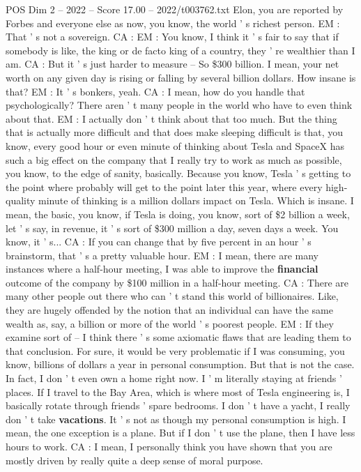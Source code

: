 \begin{textsample}{POS Dim 2 – 2022 – Score 17.00 – 2022/t003762.txt}
Elon, you are reported by Forbes and everyone else as now, you know, the world ' s richest person.
EM : That ' s not a sovereign.
CA : EM : You know, I think it ' s fair to say that if somebody is like, the king or de facto king of a country, they ' re wealthier than I am.
CA : But it ' s just harder to measure -- So \$300 billion.
I mean, your net worth on any given day is rising or falling by several billion dollars.
How insane is that?
EM : It ' s bonkers, yeah.
CA : I mean, how do you handle that psychologically?
There aren ' t many people in the world who have to even think about that.
EM : I actually don ' t think about that too much.
But the thing that is actually more difficult and that does make sleeping difficult is that, you know, every good hour or even minute of thinking about Tesla and SpaceX has such a big effect on the company that I really try to work as much as possible, you know, to the edge of sanity, basically.
Because you know, Tesla ' s getting to the point where probably will get to the point later this year, where every high-quality minute of thinking is a million dollars impact on Tesla.
Which is insane.
I mean, the basic, you know, if Tesla is doing, you know, sort of \$2 billion a week, let ' s say, in revenue, it ' s sort of \$300 million a day, seven days a week.
You know, it ' s...
CA : If you can change that by five percent in an hour ' s brainstorm, that ' s a pretty valuable hour.
EM : I mean, there are many instances where a half-hour meeting, I was able to improve the \textbf{financial} outcome of the company by \$100 million in a half-hour meeting.
CA : There are many other people out there who can ' t stand this world of billionaires.
Like, they are hugely offended by the notion that an individual can have the same wealth as, say, a billion or more of the world ' s poorest people.
EM : If they examine sort of -- I think there ' s some axiomatic flaws that are leading them to that conclusion.
For sure, it would be very problematic if I was consuming, you know, billions of dollars a year in personal consumption.
But that is not the case.
In fact, I don ' t even own a home right now.
I ' m literally staying at friends ' places.
If I travel to the Bay Area, which is where most of Tesla engineering is, I basically rotate through friends ' spare bedrooms.
I don ' t have a yacht, I really don ' t take \textbf{vacations}.
It ' s not as though my personal consumption is high.
I mean, the one exception is a plane.
But if I don ' t use the plane, then I have less hours to work.
CA : I mean, I personally think you have shown that you are mostly driven by really quite a deep sense of moral purpose.

\end{textsample}
